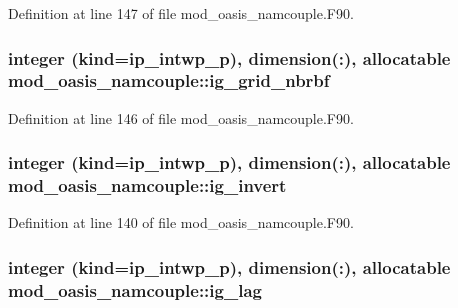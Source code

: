 Definition at line 147 of file mod\+\_\+oasis\+\_\+namcouple.\+F90.

\hypertarget{classmod__oasis__namcouple_ae81f2e658bbaeae20badef0fad425a69}{
\subsubsection[{ig\+\_\+grid\+\_\+nbrbf}]{\setlength{\rightskip}{0pt plus 5cm}integer (kind=ip\+\_\+intwp\+\_\+p), dimension(\+:), allocatable mod\+\_\+oasis\+\_\+namcouple\+::ig\+\_\+grid\+\_\+nbrbf\hspace{0.3cm}{\ttfamily [private]}}}\label{classmod__oasis__namcouple_ae81f2e658bbaeae20badef0fad425a69}


Definition at line 146 of file mod\+\_\+oasis\+\_\+namcouple.\+F90.

\hypertarget{classmod__oasis__namcouple_a0b8948452bbd8cf1dc9f0fccc17c344d}{
\subsubsection[{ig\+\_\+invert}]{\setlength{\rightskip}{0pt plus 5cm}integer (kind=ip\+\_\+intwp\+\_\+p), dimension(\+:), allocatable mod\+\_\+oasis\+\_\+namcouple\+::ig\+\_\+invert\hspace{0.3cm}{\ttfamily [private]}}}\label{classmod__oasis__namcouple_a0b8948452bbd8cf1dc9f0fccc17c344d}


Definition at line 140 of file mod\+\_\+oasis\+\_\+namcouple.\+F90.

\hypertarget{classmod__oasis__namcouple_ae2c74692147a54b3f7534301d509f766}{
\subsubsection[{ig\+\_\+lag}]{\setlength{\rightskip}{0pt plus 5cm}integer (kind=ip\+\_\+intwp\+\_\+p), dimension(\+:), allocatable mod\+\_\+oasis\+\_\+namcouple\+::ig\+\_\+lag\hspace{0.3cm}{\ttfamily [private]}}}\label{classmod__oasis__namcouple_ae2c74692147a54b3f7534301d509f766}


